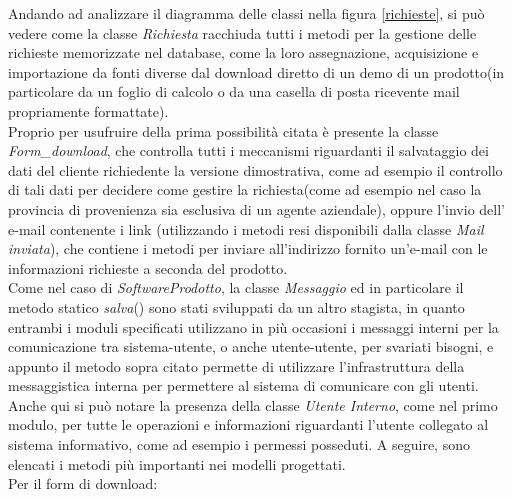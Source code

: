 \noindent
Andando ad analizzare il diagramma delle classi nella figura \ref{richieste}, si pu\`o vedere come la classe \textit{Richiesta} racchiuda tutti i metodi per la gestione delle richieste memorizzate nel database, come la loro assegnazione, acquisizione e importazione da fonti diverse dal download diretto di un demo di un prodotto(in particolare da un foglio di calcolo o da una casella di posta ricevente mail propriamente formattate). \\
Proprio per usufruire della prima possibilit\`a citata \`e presente la classe \textit{Form\_download}, che controlla tutti i meccanismi riguardanti il salvataggio dei dati del cliente richiedente la versione dimostrativa, come ad esempio il controllo di tali dati per decidere come gestire la richiesta(come ad esempio nel caso la provincia di provenienza sia esclusiva di un agente aziendale), oppure l'invio dell' e-mail contenente i link (utilizzando i metodi resi disponibili dalla classe \textit{Mail inviata}), che contiene i metodi per inviare all'indirizzo fornito un'e-mail con le informazioni richieste a seconda del prodotto. \\
Come nel caso di \textit{SoftwareProdotto}, la classe \textit{Messaggio} ed in particolare il metodo statico \textit{salva}() sono stati sviluppati da un altro stagista, in quanto entrambi i moduli specificati utilizzano in pi\`u occasioni i messaggi interni per la comunicazione tra sistema-utente, o anche utente-utente, per svariati bisogni, e appunto il metodo sopra citato permette di utilizzare l'infrastruttura della messaggistica interna per permettere al sistema di comunicare con gli utenti. \\
Anche qui si pu\`o notare la presenza della classe \textit{Utente Interno}, come nel primo modulo, per tutte le operazioni e informazioni riguardanti l'utente collegato al sistema informativo, come ad esempio i permessi posseduti.
A seguire, sono elencati i metodi pi\`u importanti nei modelli progettati.\\
Per il form di download:

